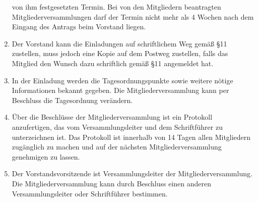 ﻿\documentclass[10pt,a4paper]{scrartcl}
\begin{document}
\begin{enumerate}
                von ihm festgesetzten Termin. Bei von den Mitgliedern beantragten
                Mitgliederversammlungen darf der Termin nicht mehr als 4 Wochen nach dem Eingang
                des Antrags beim Vorstand liegen.
        \item Der Vorstand kann die Einladungen auf schriftlichem Weg gemäß §11 zustellen, muss
                jedoch eine Kopie auf dem Postweg zustellen, falls das Mitglied den Wunsch dazu
                schriftlich gemäß §11 angemeldet hat.
        \item In der Einladung werden die Tagesordnungspunkte sowie weitere nötige Informationen
                bekannt gegeben. Die Mitgliederversammlung kann per Beschluss die Tagesordnung
                ver\-ändern.
        \item Über die Beschlüsse der Mitgliederversammlung ist ein Protokoll anzufertigen,
                das vom Versammlungsleiter und dem Schriftführer zu unterzeichnen ist.
                Das Protokoll ist innerhalb von 14 Tagen allen Mitgliedern zugänglich zu
                machen und auf der nächsten Mitgliederversammlung genehmigen zu lassen.
        \item Der Vorstandsvorsitzende ist Versammlungsleiter der Mitgliederversammlung.
                Die Mitgliederversammlung kann durch Beschluss einen anderen Versammlungsleiter
                oder Schrift\-füh\-rer bestimmen.
\end{enumerate}
%
%
\end{document}
